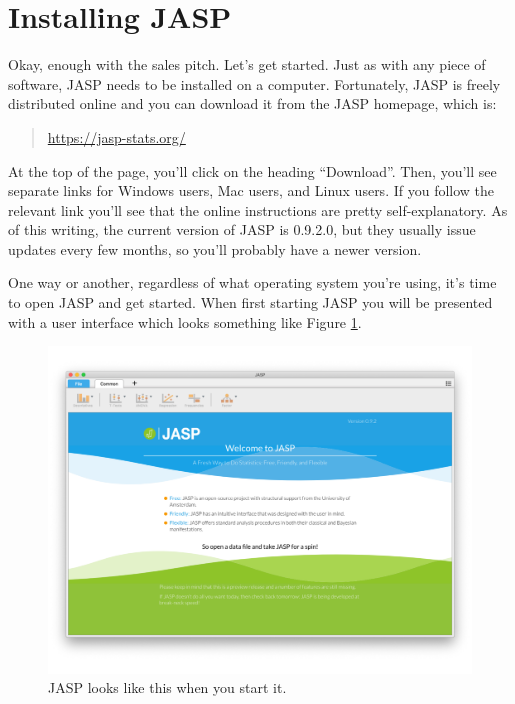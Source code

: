 \section{Installing JASP \label{sec:gettingjasp}}

Okay, enough with the sales pitch. Let's get started. Just as with any piece of software, JASP needs to be installed on a computer. Fortunately, JASP is freely distributed online and you can download it from the JASP homepage, which is:
\begin{quote}
\url{https://jasp-stats.org/}
\end{quote}
At the top of the page, you'll click on the heading ``Download''. Then, you'll see separate links for Windows users, Mac users, and Linux users. If you follow the relevant link you'll see that the online instructions are pretty self-explanatory. As of this writing, the current version of JASP is 0.9.2.0, but they usually issue updates every few months, so you'll probably have a newer version.


One way or another, regardless of what operating system you're using, it's time to open JASP and get started. When first starting JASP you will be presented with a user interface which looks something like Figure \ref{fig:startingjasp}.

\begin{figure}[ht]
\begin{center}
\includegraphics[width=14cm]{../img/introj/startingjasp.pdf}
\caption{JASP looks like this when you start it.}
\label{fig:startingjasp}
\end{center}
\end{figure}

